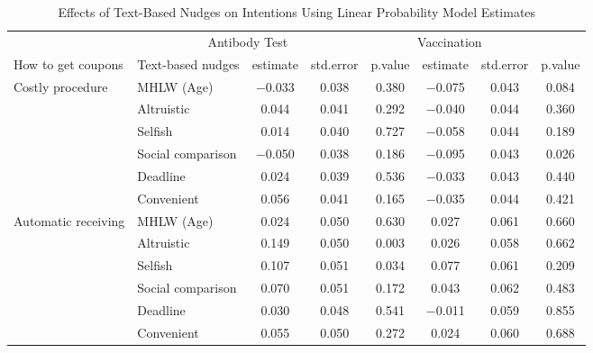 \begin{table}

\caption{Effects of Text-Based Nudges on Intentions Using Linear Probability Model Estimates \label{tab:int-reg-ftest}}
\centering
\begin{tabular}[t]{>{\raggedright\arraybackslash}p{5em}lcccccc}
\toprule
\multicolumn{2}{c}{ } & \multicolumn{3}{c}{Antibody Test} & \multicolumn{3}{c}{Vaccination} \\
\cmidrule(l{3pt}r{3pt}){3-5} \cmidrule(l{3pt}r{3pt}){6-8}
How to get coupons & Text-based nudges & estimate & std.error & p.value & estimate  & std.error  & p.value \\
\midrule
Costly procedure & MHLW (Age) & \num{-0.033} & \num{0.038} & \num{0.380} & \num{-0.075} & \num{0.043} & \num{0.084}\\
 & Altruistic & \num{0.044} & \num{0.041} & \num{0.292} & \num{-0.040} & \num{0.044} & \num{0.360}\\
 & Selfish & \num{0.014} & \num{0.040} & \num{0.727} & \num{-0.058} & \num{0.044} & \num{0.189}\\
 & Social comparison & \num{-0.050} & \num{0.038} & \num{0.186} & \num{-0.095} & \num{0.043} & \num{0.026}\\
 & Deadline & \num{0.024} & \num{0.039} & \num{0.536} & \num{-0.033} & \num{0.043} & \num{0.440}\\
 & Convenient & \num{0.056} & \num{0.041} & \num{0.165} & \num{-0.035} & \num{0.044} & \num{0.421}\\
Automatic receiving & MHLW (Age) & \num{0.024} & \num{0.050} & \num{0.630} & \num{0.027} & \num{0.061} & \num{0.660}\\
 & Altruistic & \num{0.149} & \num{0.050} & \num{0.003} & \num{0.026} & \num{0.058} & \num{0.662}\\
 & Selfish & \num{0.107} & \num{0.051} & \num{0.034} & \num{0.077} & \num{0.061} & \num{0.209}\\
 & Social comparison & \num{0.070} & \num{0.051} & \num{0.172} & \num{0.043} & \num{0.062} & \num{0.483}\\
 & Deadline & \num{0.030} & \num{0.048} & \num{0.541} & \num{-0.011} & \num{0.059} & \num{0.855}\\
 & Convenient & \num{0.055} & \num{0.050} & \num{0.272} & \num{0.024} & \num{0.060} & \num{0.688}\\
\bottomrule
\end{tabular}
\end{table}
